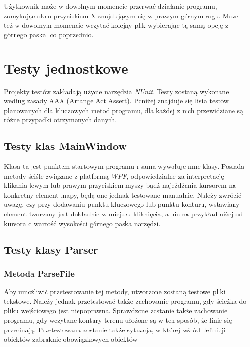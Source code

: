 \documentclass[a4paper,11pt]{article}
\newcommand\tab[1][0.6cm]{\hspace*{#1}}
\begin{document}
Użytkownik może w dowolnym momencie przerwać działanie programu, zamykając okno przyciskiem X znajdującym się w prawym górnym rogu. Może też w dowolnym momencie wczytać kolejny plik wybierając tą samą opcję z górnego paska, co poprzednio.

\section{Testy jednostkowe}

\tab Projekty testów zakładają użycie narzędzia \textit{NUnit}. Testy zostaną wykonane według zasady AAA (Arrange Act Assert). Poniżej znajduje się lista testów planowanych dla kluczowych metod programu, dla każdej z nich przewidziane są różne przypadki otrzymanych danych. 

\subsection{Testy klas MainWindow}

\tab Klasa ta jest punktem startowym programu i sama wywołuje inne klasy. Posiada metody ściśle związane z platformą \textit{WPF}, odpowiedzialne za interpretację klikania lewym lub prawym przyciskiem myszy bądź najeżdżania kursorem na konkretny element mapy, będą one jednak testowane manualnie. Należy zwrócić uwagę, czy przy dodawaniu punktu kluczowego lub punktu konturu, wstawiany element tworzony jest dokładnie w miejscu kliknięcia, a nie na przykład niżej od kursora o wartość wysokości górnego paska narzędzi.

\subsection{Testy klasy Parser}

\subsubsection{Metoda ParseFile}
\tab Aby umożliwić przetestowanie tej metody, utworzone zostaną testowe pliki tekstowe. Należy jednak przetestować także zachowanie programu, gdy ścieżka do pliku wejściowego jest niepoprawna. Sprawdzone zostanie także zachowanie programu, gdy wczytane kontury terenu ułożone są w ten sposób, że linie się przecinają. Przetestowana zostanie także sytuacja, w której wśród definicji obiektów zabraknie obowiązkowych obiektów
\end{document}
